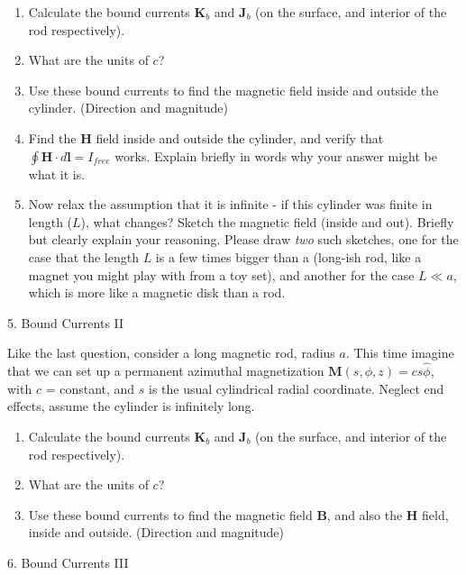 \documentclass[11pt]{article}
\def\tightlist{}
\begin{document}
\begin{enumerate}
\def\labelenumi{\arabic{enumi}.}
\tightlist
\item
  Calculate the bound currents \(\mathbf{K}_b\) and \(\mathbf{J}_b\) (on
  the surface, and interior of the rod respectively).\\
\item
  What are the units of \(c\)?
\item
  Use these bound currents to find the magnetic field inside and outside
  the cylinder. (Direction and magnitude)
\item
  Find the \(\mathbf{H}\) field inside and outside the cylinder, and
  verify that \(\oint \mathbf{H} \cdot d\mathbf{l} = I_{free}\) works.
  Explain briefly in words why your answer might be what it is.
\item
  Now relax the assumption that it is infinite - if this cylinder was
  finite in length (\(L\)), what changes? Sketch the magnetic field
  (inside and out). Briefly but clearly explain your reasoning. Please
  draw \emph{two} such sketches, one for the case that the length \(L\)
  is a few times bigger than a (long-ish rod, like a magnet you might
  play with from a toy set), and another for the case \(L \ll a\), which
  is more like a magnetic disk than a rod.
\end{enumerate}

{\Large 5. Bound Currents II}\label{bound-currents-ii}

Like the last question, consider a long magnetic rod, radius \(a\). This
time imagine that we can set up a permanent azimuthal magnetization
\(\mathbf{M}(s,\phi,z) = c s \hat{\phi}\), with \(c\) = constant, and
\(s\) is the usual cylindrical radial coordinate. Neglect end effects,
assume the cylinder is infinitely long.

\begin{enumerate}
\def\labelenumi{\arabic{enumi}.}
\tightlist
\item
  Calculate the bound currents \(\mathbf{K}_b\) and \(\mathbf{J}_b\) (on
  the surface, and interior of the rod respectively).
\item
  What are the units of \(c\)?
\item
  Use these bound currents to find the magnetic field \(\mathbf{B}\),
  and also the \(\mathbf{H}\) field, inside and outside. (Direction and
  magnitude)
\end{enumerate}

{\Large 6. Bound Currents III}\label{bound-currents-iii}
\end{document}
